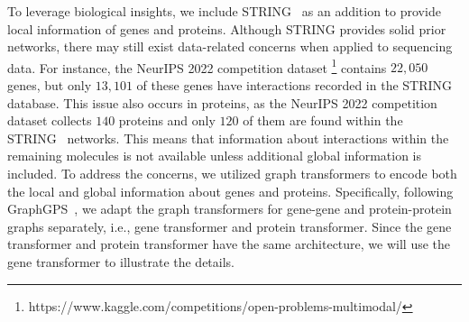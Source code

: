 To leverage biological insights, we include STRING~\cite{szklarczyk2023string} as an addition to provide local information of genes and proteins. Although STRING provides solid prior networks, there may still exist data-related concerns when applied to sequencing data. For instance, the NeurIPS 2022 competition dataset
\footnote{https://www.kaggle.com/competitions/open-problems-multimodal/} 
contains $22,050$ genes, but only $13,101$ of these genes have interactions recorded in the STRING database. This issue also occurs in proteins, as the NeurIPS 2022 competition dataset collects $140$ proteins and only $120$ of them are found within the STRING~\cite{szklarczyk2023string} networks. This means that information about interactions within the remaining molecules is not available unless additional global information is included. To address the concerns, we utilized graph transformers to encode both the local and global information about genes and proteins. Specifically, following GraphGPS~\cite{rampasek2022recipe}, we adapt the graph transformers for gene-gene and protein-protein graphs separately, i.e., gene transformer and protein transformer. 
Since the gene transformer and protein transformer have the same architecture, we will use the gene transformer to illustrate the details. 

